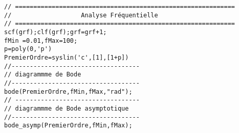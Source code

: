 \begin{code}
\begin{verbatim}
// ============================================================
//                   Analyse Fréquentielle
// ============================================================
scf(grf);clf(grf);grf=grf+1;
fMin =0.01,fMax=100;
p=poly(0,'p')
PremierOrdre=syslin('c',[1],[1+p])
//-----------------------------------
// diagrammme de Bode
//-----------------------------------
bode(PremierOrdre,fMin,fMax,"rad");
// ----------------------------------
// diagrammme de Bode asymptotique
//-----------------------------------
bode_asymp(PremierOrdre,fMin,fMax);
\end{verbatim}
\end{code}
